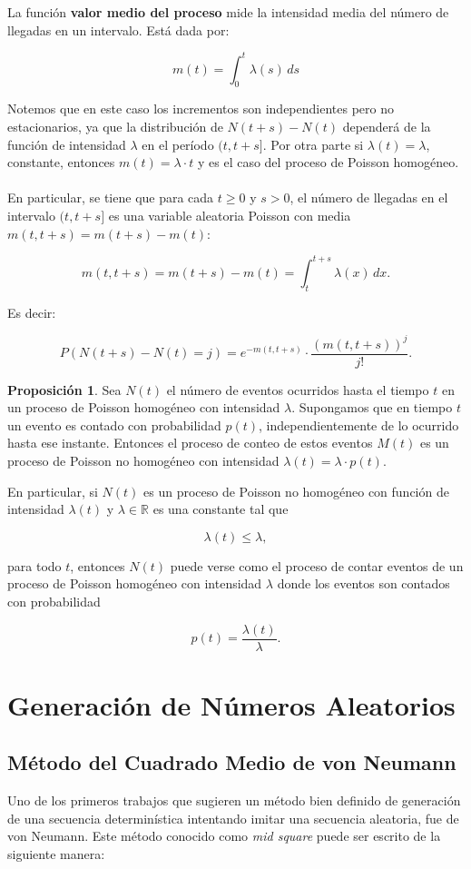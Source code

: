 \documentclass[11pt, a4paper]{article}
\theoremstyle{definition}
\newtheorem{proposition}{Proposición}
\begin{document}
La función \textbf{valor medio del proceso} mide la intensidad media del número de llegadas en un intervalo. Está dada por:

\[m(t) = \int_{0}^{t} \lambda(s) \, ds\]

Notemos que en este caso los incrementos son independientes pero no estacionarios, ya que la distribución de $N(t+s) - N(t)$ dependerá de la función de intensidad $\lambda$ en el período $(t,t+s]$. Por otra parte si $\lambda(t) = \lambda$, constante, entonces $m(t) = \lambda \cdot t$ y es el caso del proceso de Poisson homogéneo.
\\ \\
En particular, se tiene que para cada $t\geq 0$ y $s>0$, el número de llegadas en el intervalo $(t,t+s]$ es una variable aleatoria Poisson con media $m(t,t+s)=m(t+s)-m(t)$:

\[m(t,t+s)=m(t+s)-m(t)=\int_{t}^{t+s}\lambda(x)\,dx.\]

Es decir:

\[P(N(t+s)-N(t)=j)=e^{-m(t,t+s)}\cdot\frac{(m(t,t+s))^{j}}{j!}.\]

\begin{proposition}
Sea $N(t)$ el número de eventos ocurridos hasta el tiempo $t$ en un proceso de Poisson homogéneo con intensidad $\lambda$. Supongamos que en tiempo $t$ un evento es contado con probabilidad $p(t)$, independientemente de lo ocurrido hasta ese instante. Entonces el proceso de conteo de estos eventos $M(t)$ es un proceso de Poisson no homogéneo con intensidad $\lambda(t)=\lambda\cdot p(t)$.
\end{proposition}

En particular, si $N(t)$ es un proceso de Poisson no homogéneo con función de intensidad $\lambda(t)$ y $\lambda\in\mathbb{R}$ es una constante tal que

\[\lambda(t)\leq\lambda,\]

para todo $t$, entonces $N(t)$ puede verse como el proceso de contar eventos de un proceso de Poisson homogéneo con intensidad $\lambda$ donde los eventos son contados con probabilidad

\[p(t)=\frac{\lambda(t)}{\lambda}.\]


\section{Generación de Números Aleatorios}

\subsection*{ Método del Cuadrado Medio de von Neumann}
Uno de los primeros trabajos que sugieren un método bien definido de generación de una secuencia determinística intentando imitar una secuencia aleatoria, fue de von Neumann. Este método conocido como \textit{mid square} puede ser escrito de la siguiente manera:
\end{document}

